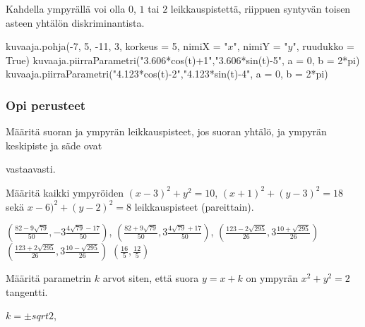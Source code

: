 Kahdella ympyrällä voi olla $0$, $1$ tai $2$ leikkauspistettä, riippuen syntyvän toisen asteen yhtälön diskriminantista. 

\begin{kuva}
    kuvaaja.pohja(-7, 5, -11, 3, korkeus = 5, nimiX = "$x$", nimiY = "$y$", ruudukko = True)
    kuvaaja.piirraParametri("3.606*cos(t)+1","3.606*sin(t)-5", a = 0, b = 2*pi)
    kuvaaja.piirraParametri("4.123*cos(t)-2","4.123*sin(t)-4", a = 0, b = 2*pi)
	
\end{kuva}

\begin{tehtavasivu}

\subsubsection*{Opi perusteet}

\begin{tehtava}
Määritä suoran ja ympyrän leikkauspisteet, jos suoran yhtälö, ja ympyrän keskipiste ja säde ovat
\begin{alakohdat}
\end{alakohdat}
vastaavasti.
\begin{vastaus}
\begin{alakohdat}
\end{alakohdat}
\end{vastaus}
\end{tehtava}

\begin{tehtava}
Määritä kaikki ympyröiden $ (x-3)^2+y^2= 10$, $(x+1)^2+(y-3)^2 = 18$ sekä $x-6)^2+(y-2)^2 = 8$ leikkauspisteet (pareittain).
\begin{vastaus}
$(\frac{82-9\sqrt{79}}{50},-3\frac{4\sqrt{79}-17}{50})$, $(\frac{82+9\sqrt{79}}{50},3\frac{4\sqrt{79}+17}{50})$,
$(\frac{123-2\sqrt{295}}{26}, 3\frac{10+\sqrt{295}}{26})$
$(\frac{123+2\sqrt{295}}{26}, 3\frac{10-\sqrt{295}}{26})$
$(\frac{16}{5}, \frac{12}{5})$
\end{vastaus}
\end{tehtava}

\begin{tehtava}
Määritä parametrin $k$ arvot siten, että suora $y=x+k$ on ympyrän  $ x^2+y^2= 2$ tangentti.
\begin{vastaus}
$k = \pm sqrt{2} $,
\end{vastaus}
\end{tehtava}



\end{tehtavasivu}
